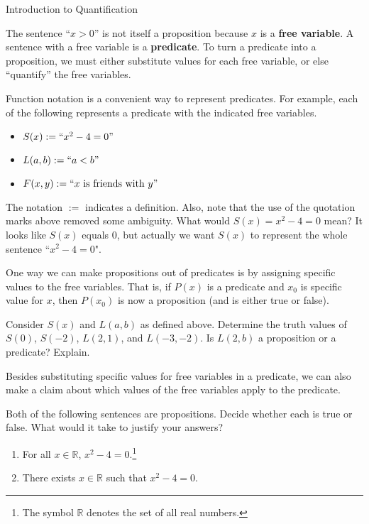 \begin{section}{Introduction to Quantification}

The sentence ``$x>0$'' is not itself a proposition because $x$ is a \textbf{free variable}. A sentence with a free variable is a \textbf{predicate}. To turn a predicate into a proposition, we must either substitute values for each free variable, or else ``quantify'' the free variables.


Function notation is a convenient way to represent predicates. For example, each of the following represents a predicate with the indicated free variables.
\begin{itemize}
\item $S(x):=``x^2-4=0"$
\item $L(a,b):=``a<b"$
\item $F(x,y):=``x \mbox{ is friends with } y"$
\end{itemize}
The notation $:=$ indicates a definition.  Also, note that the use of the quotation marks above removed some ambiguity.  What would $S(x)=x^2-4=0$ mean?  It looks like $S(x)$ equals 0, but actually we want $S(x)$ to represent the whole sentence ``$x^2-4=0$". 

One way we can make propositions out of predicates is by assigning specific values to the free variables.  That is, if $P(x)$ is a predicate and $x_0$ is specific value for $x$, then $P(x_0)$ is now a proposition (and is either true or false).

\begin{problem}
Consider $S(x)$ and $L(a,b)$ as defined above. Determine the truth values of $S(0)$, $S(-2)$, $L(2,1)$, and $L(-3,-2)$. Is $L(2,b)$ a proposition or a predicate?  Explain.
\end{problem}

Besides substituting specific values for free variables in a predicate, we can also make a claim about which values of the free variables apply to the predicate.

\begin{problem}\label{ex:quantified predicates}
Both of the following sentences are propositions. Decide whether each is true or false. What would it take to justify your answers?
\begin{enumerate}[label=\textrm{(\alph*)}]
\item For all $x\in\mathbb{R}$, $x^2-4=0$.\footnote{The symbol $\mathbb{R}$ denotes the set of all real numbers.}
\item There exists $x\in\mathbb{R}$ such that $x^2-4=0$.
\end{enumerate}
\end{problem}


\end{section}
